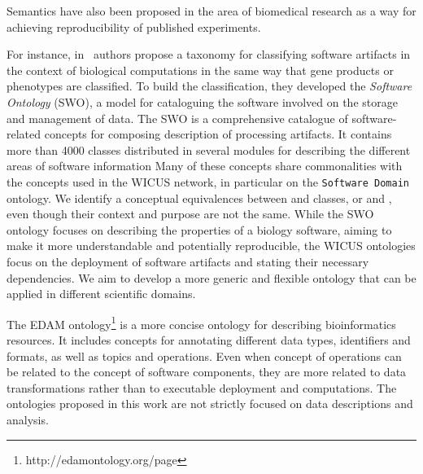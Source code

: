 Semantics have also been proposed in the area of biomedical research 
as a way for achieving reproducibility of published experiments. 

For instance, in~\cite{MaloneSWO2014} authors propose a taxonomy for 
classifying software artifacts in the context of biological computations in 
the same way that gene products or phenotypes are classified. To build the
classification, they developed the {\it Software Ontology} (SWO), a model 
for cataloguing the software involved on the storage and management of data.
The SWO is a comprehensive catalogue of software-related concepts for 
composing description of processing artifacts. It contains more than 4000 
classes distributed in several modules for describing the different areas of 
software information Many of these concepts share commonalities with the 
concepts used in the WICUS network, in particular on the \texttt{Software 
Domain} ontology. We identify a conceptual equivalences between 
 and  classes, or 
 and , even though their 
context and purpose are not the same. While the SWO ontology focuses 
on describing the properties of a biology software, aiming to make it more 
understandable and potentially reproducible, the WICUS ontologies focus 
on the deployment of software artifacts and stating their necessary 
dependencies. We aim to develop a more generic and flexible ontology 
that can be applied in different scientific domains.

The EDAM ontology\footnote{http://edamontology.org/page} is a more 
concise ontology for describing bioinformatics resources. It includes concepts 
for annotating different data types, identifiers and formats, as well as topics 
and operations. Even when concept of operations can be related to the 
concept of software components, they are more related to data 
transformations rather than to executable deployment and computations.
The ontologies proposed in this work are not strictly focused on data 
descriptions and analysis.



